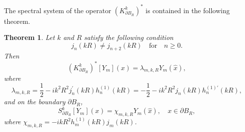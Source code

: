 \documentclass[11pt,reqno,twoside]{amsart}
\newtheorem{thm}{Theorem}[section]
\theoremstyle{definition}
\theoremstyle{remark}
\numberwithin{equation}{section}
\begin{document}
The spectral system of the operator $\left(K_{\partial B_R}^k\right)^*$ is contained in the following theorem.

\begin{thm}\label{thm:eigenvalue_k-star}
Let $k$ and $R$ satisfy the following condition
\begin{equation}\label{eq:assumption_kR}
  j_n(kR)\neq j_{n+2}(kR) \quad \mbox{for} \quad n\geq 0.
\end{equation}
Then
\begin{equation}
  \left(K_{\partial B_R}^k\right)^*[Y_m](x)=\lambda_{m,k,R} Y_m(\hat{x}),
\end{equation}
where
\begin{equation}\label{eq:eigenvalue_lambda_m}
  \lambda_{m,k,R}=\frac{1}{2}-i k^2 R^2 j_n^{\prime}(kR) h_n^{(1)}(kR)=-\frac{1}{2}-i k^2 R^2 j_n(kR) h_n^{(1)\prime}(kR) ,
\end{equation}
and on the boundary $\partial B_R$,
\[
   S_{\partial B_R}^{k}[Y_m](x)=\chi_{m,k,R} Y_m(\hat{x}), \quad x\in \partial B_R,
\]
 where $\chi_{m,k,R}=-i k R^2 h_m^{(1)}(kR) j_m(kR)$.
\end{thm}
\end{document}
